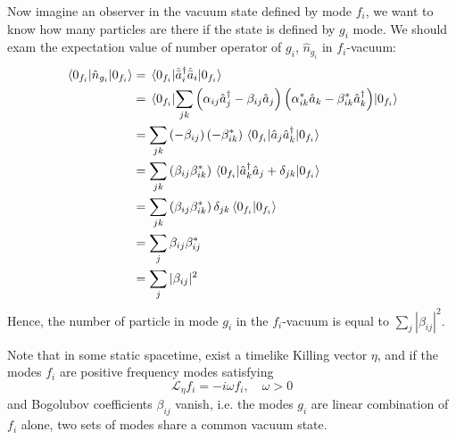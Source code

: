 \documentclass[12pt]{article}
\numberwithin{equation}{subsection}
\theoremstyle{mystyle}{\newtheorem{definition}{Definition}[subsection]}
\theoremstyle{mystyle}{\newtheorem{theorem}[definition]{Theorem}}
\theoremstyle{mystyle}{\newtheorem*{remark}{Remark}}
\theoremstyle{mystyle}{\newtheorem{example}{Example}[subsection]}
\theoremstyle{mystyle}{\newtheorem{examples}{Examples}[subsection]}
\theoremstyle{mystyle}{\newtheorem{cthm}{}[subsection]}
\begin{document}
Now imagine an observer in the vacuum state defined by mode \(f_i\), we want to know how many particles are there if the state is defined by \(g_i\) mode.
We should exam the expectation value of number operator of \(g_i\), \(\hat{n}_{g_i}\) in \(f_i\)-vacuum:
\begin{align}
  \expval{\hat{n}_{g_i}}{0_{f_i}}&=\expval{\hat{\bar{a}}_i^\dagger \hat{\bar{a}}_i}{0_{f_i}}\\
  &=\expval{\sum_{jk}\left(\alpha_{ij}\hat{a}^{\dagger}_j-\beta_{ij}\hat{a}_j\right)\left(\alpha^*_{ik}\hat{a}_k-\beta^*_{ik}\hat{a}^{\dagger}_k\right)}{0_{f_i}}\\
  &=\sum_{jk}\left(-\beta_{ij}\right)\left(-\beta^*_{ik}\right)\expval{\hat{a}_j\hat{a}^{\dagger}_k}{0_{f_i}}\\
  &=\sum_{jk}\left(\beta_{ij}\beta^*_{ik}\right)\expval{\hat{a}^{\dagger}_k\hat{a}_j+\delta_{jk}}{0_{f_i}}\\
  &=\sum_{jk}\left(\beta_{ij}\beta^*_{ik}\right)\delta_{jk}\braket{0_{f_i}}{0_{f_i}}\\
  &=\sum_{j}\beta_{ij}\beta^*_{ij}\\
  &=\sum_{j}|\beta_{ij}|^2\\
\end{align}
Hence, the number of particle in mode \(g_i\) in the \(f_i\)-vacuum is equal to \(\sum_{j}|\beta_{ij}|^2\).

Note that in some static spacetime, exist a timelike Killing vector \(\eta\), and if the modes \(f_i\) are positive frequency
modes satisfying
\begin{equation}
  \mathcal{L}_{\eta}f_i=-i\omega f_i,\quad \omega>0
\end{equation}
and Bogolubov coefficients \(\beta_{ij}\) vanish, i.e. the modes \(g_i\) are linear combination of \(f_i\) alone, 
two sets of modes share a common vacuum state.
\newpage
\end{document}
